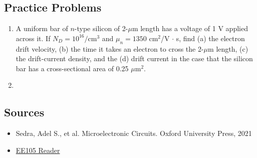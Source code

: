 \subsection{Practice Problems}
\begin{enumerate}
    \item A uniform bar of $n$-type silicon of 2-$\mu$m length has a voltage of 1 V applied across it. If $N_D = 10^{16}/\text{cm}^3$ and $\mu_n = 1350$ cm$^2$/V $\cdot$ s, find (a) the electron drift velocity, (b) the time it takes an electron to cross the 2-$\mu$m length, (c) the drift-current density, and the (d) drift current in the case that the silicon bar has a cross-sectional area of 0.25 $\mu$m$^2$.
    \begin{Ans}
    \end{Ans}

    \item 
\end{enumerate}

\subsection{Sources}
\begin{itemize}
    \item Sedra, Adel S., et al. Microelectronic Circuits. Oxford University Press, 2021
    \item \href{https://file.notion.so/f/f/048d6522-202b-48d4-b5d9-bc005bd602e2/214bf1f0-292f-48d6-9016-737d9f5da155/ee105_reader_v3.pdf?id=237a4300-3dbe-47d1-888b-ffae90d8352b&table=block&spaceId=048d6522-202b-48d4-b5d9-bc005bd602e2&expirationTimestamp=1714435200000&signature=yx-H1qvZJIodPfazOpwXX0Ce2mWMG8skOHl45xoPxus&downloadName=ee105_reader_v3.pdf}{EE105 Reader}
\end{itemize}
